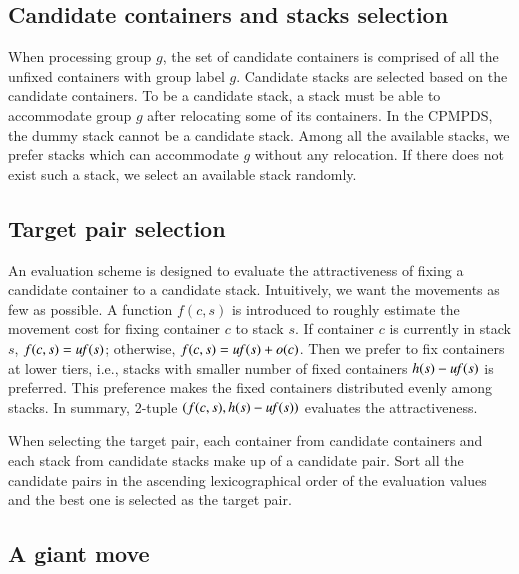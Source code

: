 \documentclass[review,3p,times,authoryear,12pt]{elsarticle}
\begin{document}
\subsection{Candidate containers and stacks selection}
\label{sec:can}
When processing group $g$, the set of candidate containers is comprised of all the unfixed containers with group label $g$. Candidate stacks are selected based on the candidate containers.
To be a candidate stack, a stack must be able to accommodate group $g$ after relocating some of its containers.
In the CPMPDS, the dummy stack cannot be a candidate stack. Among all the available stacks, we prefer stacks which can accommodate $g$ without any relocation. If there does not exist such a stack, we select an available stack randomly.

\subsection{Target pair selection}
\label{sec:tar}
An evaluation scheme is designed to evaluate the attractiveness of fixing a candidate container to a candidate stack.
Intuitively, we want the movements as few as possible. A function $f(c,s)$ is introduced to roughly estimate the movement cost for fixing container $c$ to stack $s$. If container $c$ is currently in stack $s$, $f(c,s)=\id{uf}(s)$; otherwise, $f(c,s)=\id{uf}(s)+o(c)$. Then we prefer to fix containers at lower tiers, i.e., stacks with smaller number of fixed containers $h(s)-\id{uf}(s)$ is preferred. This preference makes the fixed containers distributed evenly among stacks. In summary, 2-tuple $(f(c,s), h(s)-\id{uf}(s))$ evaluates the attractiveness.

When selecting the target pair, each container from candidate containers and each stack from candidate stacks make up of a candidate pair. Sort all the candidate pairs in the ascending lexicographical order of the evaluation values and the best one is selected as the target pair.

\subsection{A giant move}
\end{document}

